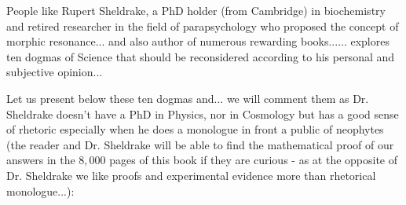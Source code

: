 	People like Rupert Sheldrake, a PhD holder (from Cambridge) in biochemistry and retired researcher in the field of parapsychology who proposed the concept of morphic resonance... and also author of numerous rewarding books...... explores ten dogmas of Science that should be reconsidered according to his personal and subjective opinion... 
	
	Let us present below these ten dogmas and... we will comment them as Dr. Sheldrake doesn't have a PhD in Physics, nor in Cosmology but has a good sense of rhetoric especially when he does a monologue in front a public of neophytes (the reader and Dr. Sheldrake will be able to find the mathematical proof of our answers in the $8,000$ pages of this book if they are curious - as at the opposite of Dr. Sheldrake we like proofs and experimental evidence more than rhetorical monologue...):
